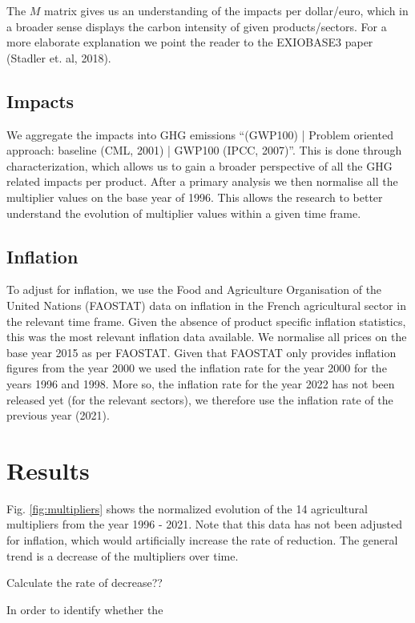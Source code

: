 \documentclass[a4paper,twoside]{article}
\begin{document}
The $M$ matrix gives us an understanding of the impacts per dollar/euro, which in a broader sense displays the carbon intensity of given products/sectors. For a more elaborate explanation we point the reader to the EXIOBASE3 paper (Stadler et. al, 2018).

\subsection{Impacts}

We aggregate the impacts into GHG emissions “(GWP100) | Problem oriented approach: baseline (CML, 2001) | GWP100 (IPCC, 2007)”. This is done through characterization, which allows us to gain a broader perspective of all the GHG related impacts per product. After a primary analysis we then normalise all the multiplier values on the base year of 1996. This allows the research to better understand the evolution of multiplier values within a given time frame.


\subsection{Inflation}

To adjust for inflation, we use the Food and Agriculture Organisation of the United Nations (FAOSTAT) data on inflation in the French agricultural sector in the relevant time frame. Given the absence of product specific inflation statistics, this was the most relevant inflation data available. We normalise all prices on the base year 2015 as per FAOSTAT. Given that FAOSTAT only provides inflation figures from the year 2000 we used the inflation rate for the year 2000 for the years 1996 and 1998. More so, the inflation rate for the year 2022 has not been released yet (for the relevant sectors), we therefore use the inflation rate of the previous year (2021).

\section{Results}

Fig. \ref{fig:multipliers} shows the normalized evolution of the 14 agricultural multipliers from the year 1996 - 2021. Note that this data has not been adjusted for inflation, which would artificially increase the rate of reduction. The general trend is a decrease of the multipliers over time.

Calculate the rate of decrease??

In order to identify whether the 
\end{document}
